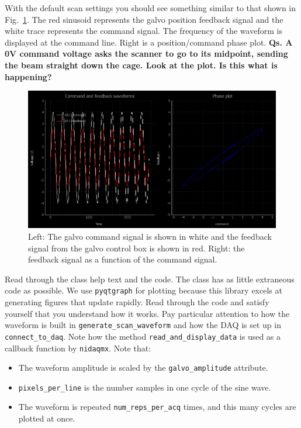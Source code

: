 \documentclass[a4paper]{report}
\begin{document}
\noindent       
With the default scan settings you should see something similar to that shown in Fig.~\ref{waveformTester01}.
The red sinusoid represents the galvo position feedback signal and the white trace represents the command signal. 
The frequency of the waveform is displayed at the command line. 
Right is a position/command phase plot. 
\textbf{Qs. A 0V command voltage asks the scanner to go to its midpoint, sending the beam straight down the cage. Look at the plot. Is this what is happening?}


\begin{figure}[h]
\centering
\includegraphics[width=5.0in]{Capture_01.PNG}
\caption{Left: The galvo command signal is shown in white and the feedback signal from the galvo control box is shown in red. 
Right: the feedback signal as a function of the command signal.}
\label{waveformTester01}
\end{figure}


\noindent
Read through the class help text and the code. 
The class has as little extraneous code as possible. 
We use \texttt{pyqtgraph} for plotting because this library excels at generating figures that update rapidly.   
Read through the code and satisfy yourself that you understand how it works. 
Pay particular attention to how the waveform is built in \texttt{generate\_scan\_waveform} and how the DAQ is set up in \texttt{connect\_to\_daq}.
Note how the method \texttt{read\_and\_display\_data} is used as a callback function by \texttt{nidaqmx}. 
Note that:

\begin{itemize}
    \setlength\itemsep{0.15em}
    \item The waveform amplitude is scaled by the \texttt{galvo\_amplitude} attribute.
    \item \texttt{pixels\_per\_line} is the number samples in one cycle of the sine wave. 
    \item The waveform is repeated \texttt{num\_reps\_per\_acq} times, and this many cycles are plotted at once. 
\end{itemize}
\end{document}
